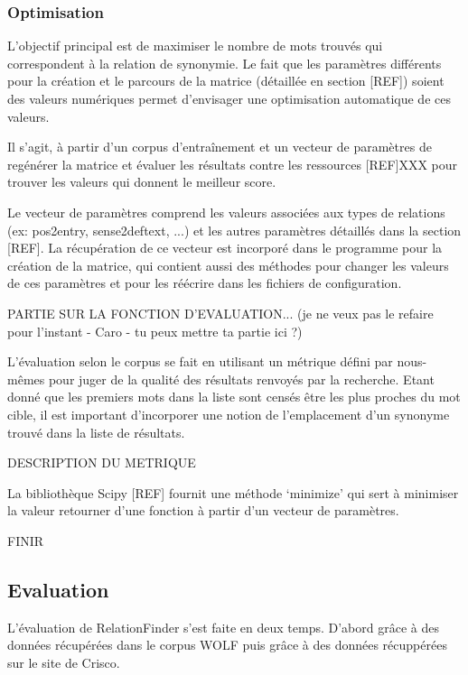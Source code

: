 \subsubsection{Optimisation}

L'objectif principal est de maximiser le nombre de mots trouvés qui 
correspondent à la relation de synonymie. Le fait que les paramètres différents 
pour la création et le parcours de la matrice (détaillée en section [REF]) 
soient des valeurs numériques permet d'envisager une optimisation automatique de 
ces valeurs.

Il s'agit, à partir d'un corpus d'entraînement et un vecteur de paramètres de 
regénérer la matrice et évaluer les résultats contre les ressources [REF]XXX 
pour trouver les valeurs qui donnent le meilleur score.

Le vecteur de paramètres comprend les valeurs associées aux types de relations 
(ex: pos2entry, sense2deftext, ...) et les autres paramètres détaillés dans la 
section [REF]. La récupération de ce vecteur est incorporé dans le programme 
pour la création de la matrice, qui contient aussi des méthodes pour changer les 
valeurs de ces paramètres et pour les réécrire dans les fichiers de 
configuration.

PARTIE SUR LA FONCTION D'EVALUATION... (je ne veux pas le refaire pour 
l'instant - Caro - tu peux mettre ta partie ici ?)

L'évaluation selon le corpus se fait en utilisant un métrique défini par 
nous-mêmes pour juger de la qualité des résultats renvoyés par la recherche. 
Etant donné que les premiers mots dans la liste sont censés être les plus 
proches du mot cible, il est important d'incorporer une notion de l'emplacement 
d'un synonyme trouvé dans la liste de résultats.

DESCRIPTION DU METRIQUE

La bibliothèque Scipy [REF] fournit une méthode \lq{minimize}\rq{} qui sert à 
minimiser la valeur retourner d'une fonction à partir d'un vecteur de 
paramètres.

FINIR



\subsection{Evaluation}

L'évaluation de RelationFinder s'est faite en deux temps. D'abord grâce à des 
données récupérées dans le corpus WOLF puis grâce à des données récuppérées sur 
le site de Crisco.

